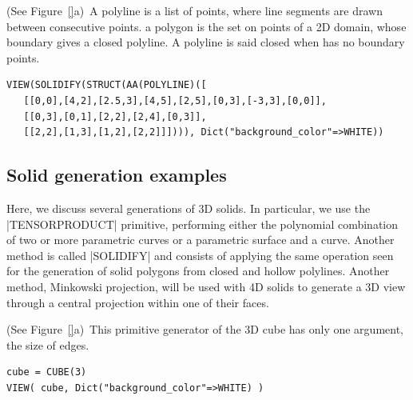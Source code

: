 \begin{coding}[Algebraic computation of FE = $\delta_1$]
\begin{condition} (See Figure~\ref{}a)\
A polyline is a list of points, where line segments are drawn between consecutive points.  a polygon is the set on points of a 2D domain, whose boundary gives a closed polyline. A polyline is said closed when has no boundary points.
\begin{lstlisting}[language=JuliaLocal, style=julia, mathescape=true]
VIEW(SOLIDIFY(STRUCT(AA(POLYLINE)([
   [[0,0],[4,2],[2.5,3],[4,5],[2,5],[0,3],[-3,3],[0,0]],
   [[0,3],[0,1],[2,2],[2,4],[0,3]],
   [[2,2],[1,3],[1,2],[2,2]]]))), Dict("background_color"=>WHITE))
\end{lstlisting}
\end{condition}





\subsection{ Solid generation examples}\label{sect:5-4-3}

Here, we discuss several generations of 3D solids. In particular, we use the |TENSORPRODUCT| primitive, performing either the polynomial combination of two or more parametric curves or a parametric surface and a curve. Another method is called |SOLIDIFY| and consists of applying the same operation seen for the generation of solid polygons from closed and hollow polylines.
Another method, Minkowski projection, will be used with 4D solids to generate a 3D view through a central projection within one of their faces.

\begin{condition}[(CUBE primitive] (See Figure~\ref{}a)\
This primitive generator of the 3D cube has only one argument, the size of edges. 
\begin{lstlisting}[language=JuliaLocal, style=julia, mathescape=true]
cube = CUBE(3)
VIEW( cube, Dict("background_color"=>WHITE) )
\end{lstlisting}
\end{condition}



\end{coding}
